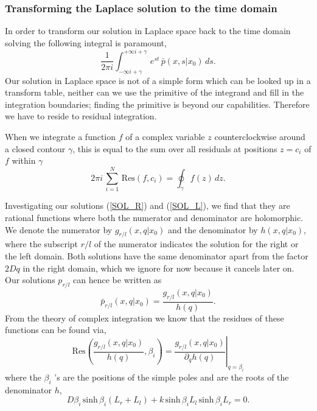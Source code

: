 \subsubsection{Transforming the Laplace solution to the time domain}

In order to transform our solution in Laplace space back to the time domain solving the following integral is paramount,
\begin{equation}
 \frac{1}{2 \pi i} \int_{-\infty i + \gamma}^{+\infty i + \gamma} \, e^{s t} \, \bar{p}(x,s|x_0) \, ds.
 \label{INT_I}
\end{equation}
Our solution in Laplace space is not of a simple form which can be looked up in a transform table, neither can we use the primitive of the integrand and fill in the integration boundaries; finding the primitive is beyond our capabilities. Therefore we have to reside to residual integration. 

When we integrate a function $f$ of a complex variable $z$ counterclockwise around a closed contour $\gamma$, this is equal to the sum over all residuals at positions $z = c_i$ of $f$ within $\gamma$
\begin{equation}
 2 \pi i\,\sum_{i=1}^{N}\,\mathrm{Res}(f,c_i) = \oint_\gamma f(z)\,dz.
 \label{RES_I}
\end{equation}

Investigating our solutions (\ref{SOL_R}) and (\ref{SOL_L}), we find that they are rational functions where both the numerator and denominator are holomorphic. We denote the numerator by $g_{r/l}(x,q|x_0)$ and the denominator by $h(x,q|x_0)$, where the subscript $r/l$ of the numerator indicates the solution for the right or the left domain. Both solutions have the same denominator apart from the factor $2 D q$ in the right domain, which we ignore for now because it cancels later on. Our solutions $p_{r/l}$ can hence be written as
\begin{equation} 
 \bar{p}_{r/l}(x,q|x_0) = \frac{g_{r/l}(x,q|x_0)}{h(q)}.
\end{equation}
From the theory of complex integration we know that the residues of these functions can be found via,
\begin{equation} 
 \mathrm{Res} \left( \frac{g_{r/l}(x,q|x_0)}{h(q)},\beta_i \right) = \left. \frac{g_{r/l}(x,q|x_0)}{\partial_q h(q)} \right|_{q = \beta_i}
 \label{RES_II}
\end{equation}
where the $\beta_i$ 's are the positions of the simple poles and are the roots of the denominator $h$,
\begin{equation} 
 D\beta_i \, \mathrm{sinh} \, \beta_i (L_r + L_l) + k \, \mathrm{sinh} \, \beta_i L_l \, \mathrm{sinh} \, \beta_i L_r = 0.
 \label{ROOT_I}
\end{equation}

